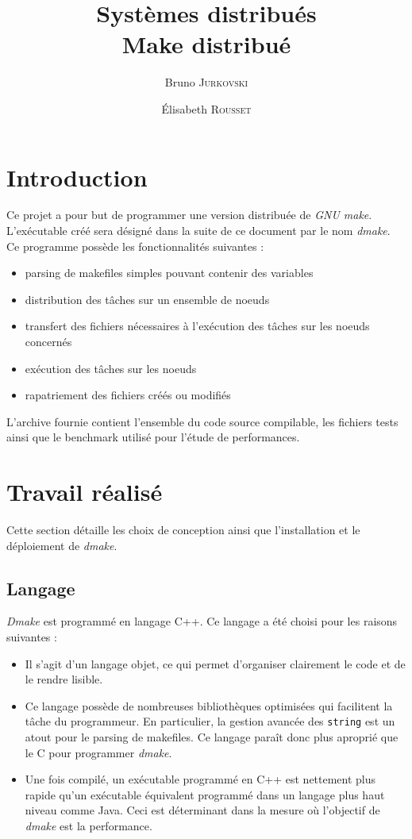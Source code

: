 \documentclass[a4paper,12pt,twoside]{article}
\title{Systèmes distribués\\
  Make distribué}
\author{Bruno \textsc{Jurkovski}\and Élisabeth \textsc{Rousset}}
\begin{document}
\maketitle
\newpage

\tableofcontents

\listoffigures

\newpage

\section*{Introduction}

Ce projet a pour but de programmer une version distribuée de \emph{GNU
  make}. L'exécutable créé sera désigné dans la suite de ce document
par le nom \emph{dmake}. Ce programme possède les fonctionnalités
suivantes :
\begin{itemize}
\item parsing de makefiles simples pouvant contenir des variables
\item distribution des tâches sur un ensemble de noeuds
\item transfert des fichiers nécessaires à l'exécution des tâches sur
  les noeuds concernés
\item exécution des tâches sur les noeuds
\item rapatriement des fichiers créés ou modifiés
\end{itemize}
L'archive fournie contient l'ensemble du code source compilable, les
fichiers tests ainsi que le benchmark utilisé pour l'étude de performances.

\section{Travail réalisé}

Cette section détaille les choix de conception ainsi que
l'installation et le déploiement de \emph{dmake}.

\subsection{Langage}

\emph{Dmake} est programmé en langage C++. Ce langage a été choisi
pour les raisons suivantes :
\begin{itemize}
\item Il s'agit d'un langage objet, ce qui permet d'organiser
  clairement le code et de le rendre lisible.
\item Ce langage possède de nombreuses bibliothèques optimisées qui
  facilitent la tâche du programmeur. En particulier, la gestion
  avancée des \texttt{string} est un atout pour le parsing de
  makefiles. Ce langage paraît donc plus aproprié que le C pour
  programmer \emph{dmake}.
\item Une fois compilé, un exécutable programmé en C++ est nettement
  plus rapide qu'un exécutable équivalent programmé dans un langage
  plus haut niveau comme Java. Ceci est déterminant dans la mesure où
  l'objectif de \emph{dmake} est la performance.
\end{itemize}
\end{document}

